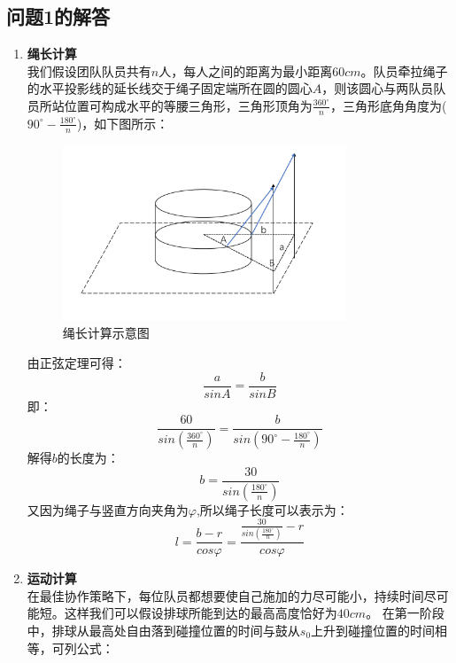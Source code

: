 \documentclass{cumcm}
\begin{document}
\subsection{问题1的解答}
\begin{enumerate}
\item \textbf{绳长计算}\\
我们假设团队队员共有$n$人，每人之间的距离为最小距离$60cm$。队员牵拉绳子的水平投影线的延长线交于绳子固定端所在圆的圆心$A$，则该圆心与两队员队员所站位置可构成水平的等腰三角形，三角形顶角为$\frac{360^{\circ}}{n}$，三角形底角角度为($90^{\circ}-\frac{180^{\circ}}{n}$)，如下图所示：
\begin{figure}[H]
\centering
\includegraphics[width=0.8\textwidth]{img/string.pdf}
\caption{绳长计算示意图}
\end{figure}
由正弦定理可得：
\begin{displaymath}
\frac{a}{sinA}=\frac{b}{sinB}
\end{displaymath}
即：
\begin{displaymath}
\frac{60}{sin({\frac{360^{\circ}}{n}})}=\frac{b}{sin({90^{\circ}-\frac{180^{\circ}}{n}})}
\end{displaymath}
解得$b$的长度为：
\begin{displaymath}
b=\frac{30}{sin( \frac{180^{\circ}}{n})}
\end{displaymath}
又因为绳子与竖直方向夹角为$\varphi$,所以绳子长度可以表示为：
\begin{equation}
l=\frac{b-r}{cos\varphi}=\frac{\frac{30}{sin(\frac{180^{\circ}}{n})}-r}{cos\varphi}
\end{equation}
\item \textbf{运动计算}\\
在最佳协作策略下，每位队员都想要使自己施加的力尽可能小，持续时间尽可能短。这样我们可以假设排球所能到达的最高高度恰好为$40cm$。
在第一阶段中，排球从最高处自由落到碰撞位置的时间与鼓从$s_0$上升到碰撞位置的时间相等，可列公式：

\end{enumerate}
\end{document}
